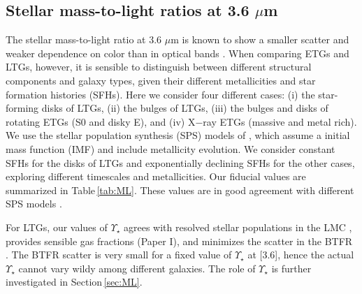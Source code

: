 \documentclass[apjl, twocolappendix]{emulateapj}
\begin{document}
\subsection{Stellar mass-to-light ratios at 3.6 $\mu$m}\label{sec:MLsp}
 
The stellar mass-to-light ratio at 3.6 $\mu$m is known to show a smaller scatter and weaker dependence on color than in optical bands \citep[e.g.,][]{McGaugh2014b, Meidt2014}. When comparing ETGs and LTGs, however, it is sensible to distinguish between different structural components and galaxy types, given their different metallicities and star formation histories (SFHs). Here we consider four different cases: (i) the star-forming disks of LTGs, (ii) the bulges of LTGs, (iii) the bulges and disks of rotating ETGs (S0 and disky E), and (iv) X$-$ray ETGs (massive and metal rich). We use the stellar population synthesis (SPS) models of \citet{Schombert2014a}, which assume a \citet{Chabrier2003} initial mass function (IMF) and include metallicity evolution. We consider constant SFHs for the disks of LTGs and exponentially declining SFHs for the other cases, exploring different timescales and metallicities. Our fiducial values are summarized in Table\,\ref{tab:ML}. These values are in good agreement with different SPS models \citep{McGaugh2014b, Meidt2014, Norris2016}.

For LTGs, our values of $\Upsilon_{\star}$ agrees with resolved stellar populations in the LMC \citep{Eskew2012}, provides sensible gas fractions (Paper I), and minimizes the scatter in the BTFR \citep{Lelli2016}. The BTFR scatter is very small for a fixed value of $\Upsilon_{\star}$ at [3.6], hence the actual $\Upsilon_{\star}$ cannot vary wildy among different galaxies. The role of $\Upsilon_{\star}$ is further investigated in Section\,\ref{sec:ML}.
\end{document}
